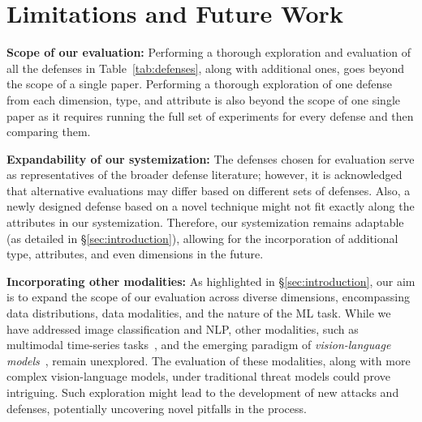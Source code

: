 \section{Limitations and Future Work}\label{sec:future}
\noindent\textbf{Scope of our evaluation: }
Performing a thorough exploration and evaluation of all the defenses in Table~\ref{tab:defenses}, along with additional ones, goes beyond the scope of a single paper. Performing a thorough exploration of one defense from each dimension, type, and attribute is also beyond the scope of one single paper as it requires running the full set of experiments for every defense and then comparing them.

\noindent\textbf{Expandability of our systemization: }
The defenses chosen for evaluation serve as representatives of the broader defense literature; however, it is acknowledged that alternative evaluations may differ based on different sets of defenses. Also, a newly designed defense based on a novel technique might not fit exactly along the attributes in our systemization. Therefore, our systemization remains adaptable (as detailed in \S\ref{sec:introduction}), allowing for the incorporation of additional type, attributes, and even dimensions in the future.

\noindent\textbf{Incorporating other modalities:}
As highlighted in \S\ref{sec:introduction}, our aim is to expand the scope of our evaluation across diverse dimensions, encompassing data distributions, data modalities, and the nature of the ML task. While we have addressed image classification and NLP, other modalities, such as multimodal time-series tasks~\cite{zhao2022multimodal}, and the emerging paradigm of \emph{vision-language models}~\cite{radford2021learning}, remain unexplored. The evaluation of these modalities, along with more complex vision-language models, under traditional threat models could prove intriguing. Such exploration might lead to the development of new attacks and defenses, potentially uncovering novel pitfalls in the process.
